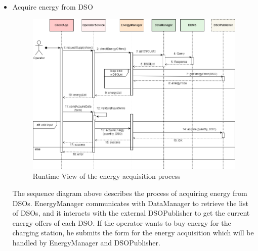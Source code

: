 \documentclass[../main.tex]{subfiles}
\begin{document}
\begin{itemize}
    \newpage
    \item Acquire energy from DSO
    {
    \vspace{2em}
    \begin{figure}[H]
    \centering
    \includegraphics[width=\textwidth]{runtimeview/op_acquire.png}
    \caption{Runtime View of the energy acquisition process}
    \label{fig:op_acquire}
    \end{figure}}
    The sequence diagram above describes the process of acquiring energy from DSOs. EnergyManager communicates with DataManager to retrieve the list of DSOs, and it interacts with the external DSOPublisher to get the current energy offers of each DSO. If the operator wants to buy energy for the charging station, he submits the form for the energy acquisition which will be handled by EnergyManager and DSOPublisher.


\end{itemize}
\end{document}

